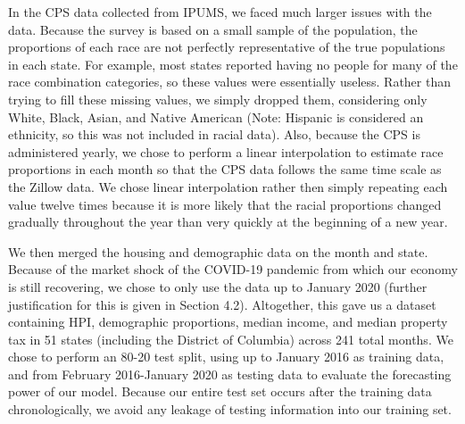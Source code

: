\documentclass[11pt]{amsart}
\begin{document}
In the CPS data collected from IPUMS, we faced much larger issues with the data.
Because the survey is based on a small sample of the population, the proportions of each race are not perfectly representative of the true populations in each state.
For example, most states reported having no people for many of the race combination categories, so these values were essentially useless.
Rather than trying to fill these missing values, we simply dropped them, considering only White, Black, Asian, and Native American (Note: Hispanic is considered an ethnicity, so this was not included in racial data).
Also, because the CPS is administered yearly, we chose to perform a linear interpolation to estimate race proportions in each month so that the CPS data follows the same time scale as the Zillow data.
We chose linear interpolation rather then simply repeating each value twelve times because it is more likely that the racial proportions changed gradually throughout the year than very quickly at the beginning of a new year.

We then merged the housing and demographic data on the month and state.
Because of the market shock of the COVID-19 pandemic from which our economy is still recovering, we chose to only use the data up to January 2020 (further justification for this is given in Section 4.2).
Altogether, this gave us a dataset containing HPI, demographic proportions, median income, and median property tax in 51 states (including the District of Columbia) across 241 total months.
We chose to perform an 80-20 test split, using up to January 2016 as training data, and from February 2016-January 2020 as testing data to evaluate the forecasting power of our model. Because our entire test set occurs after the training data chronologically, we avoid any leakage of testing information into our training set.

\end{document}
